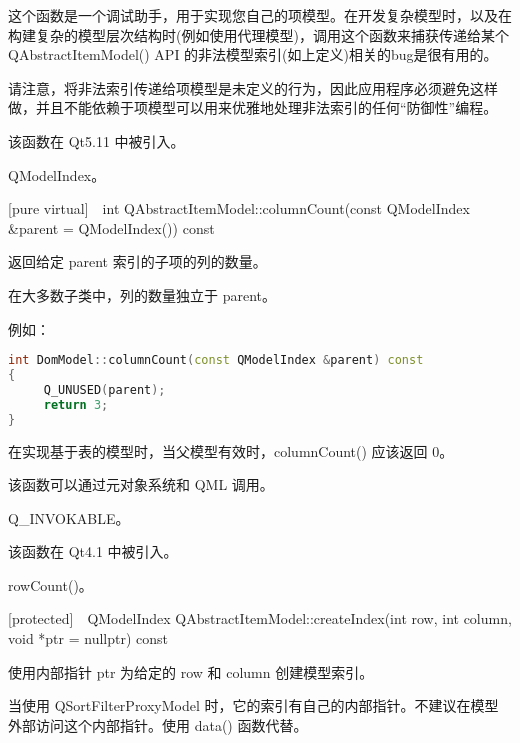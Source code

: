 \begin{notice}
这个函数是一个调试助手，用于实现您自己的项模型。在开发复杂模型时，以及在构建复杂的模型层次结构时(例如使用代理模型)，调用这个函数来捕获传递给某个 QAbstractItemModel() API 的非法模型索引(如上定义)相关的bug是很有用的。
\end{notice}

\begin{notice}[警告]
请注意，将非法索引传递给项模型是未定义的行为，因此应用程序必须避免这样做，并且不能依赖于项模型可以用来优雅地处理非法索引的任何“防御性”编程。
\end{notice}


该函数在 Qt5.11 中被引入。

\begin{seeAlso}
QModelIndex。
\end{seeAlso}

[pure virtual] int QAbstractItemModel::columnCount(const QModelIndex \&parent = QModelIndex()) const

返回给定 parent 索引的子项的列的数量。

在大多数子类中，列的数量独立于 parent。

例如：

\begin{lstlisting}[language=C++]
int DomModel::columnCount(const QModelIndex &parent) const
{
     Q_UNUSED(parent);
     return 3;
}
\end{lstlisting}

\begin{notice}
在实现基于表的模型时，当父模型有效时，columnCount() 应该返回 0。
\end{notice}

\begin{notice}
该函数可以通过元对象系统和 QML 调用。
\end{notice}

\begin{seeAlso}
Q\_INVOKABLE。
\end{seeAlso}

该函数在 Qt4.1 中被引入。

\begin{seeAlso}
rowCount()。
\end{seeAlso}

[protected] QModelIndex QAbstractItemModel::createIndex(int row, int column, void *ptr = nullptr) const

使用内部指针 ptr 为给定的 row 和 column 创建模型索引。

当使用 QSortFilterProxyModel 时，它的索引有自己的内部指针。不建议在模型外部访问这个内部指针。使用 data() 函数代替。

